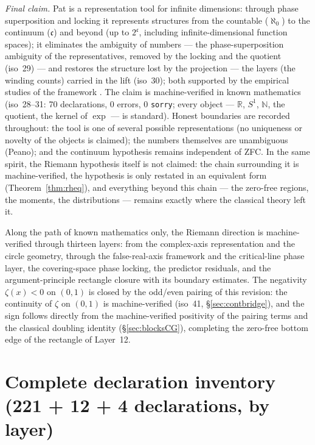 \documentclass{article}
\newcommand{\zt}{\zeta}
\begin{document}
\emph{Final claim.} Pat is a representation tool for infinite
dimensions: through phase superposition and locking it represents
structures from the countable ($\aleph_0$) to the continuum
($\mathfrak c$) and beyond (up to $2^{\mathfrak c}$, including
infinite-dimensional function spaces); it eliminates the ambiguity of
numbers --- the phase-superposition ambiguity of the representatives,
removed by the locking and the quotient (iso~29) --- and restores the
structure lost by the projection --- the layers (the winding counts)
carried in the lift (iso~30); both supported by the empirical studies
of the framework \cite{patbase}. The claim is machine-verified
in known mathematics (iso~28--31: 70 declarations, 0 errors, 0
\texttt{sorry}; every object --- $\mathbb R$, $S^1$, $\mathbb N$, the
quotient, the kernel of $\exp$ --- is standard). Honest boundaries are
recorded throughout: the tool is one of several possible
representations (no uniqueness or novelty of the objects is claimed);
the numbers themselves are unambiguous (Peano); and the continuum
hypothesis remains independent of ZFC. In the same spirit, the Riemann
hypothesis itself is not claimed: the chain surrounding it is
machine-verified, the hypothesis is only restated in an equivalent
form (Theorem~\ref{thm:rheq}), and everything beyond this chain ---
the zero-free regions, the moments, the distributions --- remains
exactly where the classical theory left it.

Along the path of known mathematics only, the Riemann direction is
machine-verified through thirteen layers: from the complex-axis representation
and the circle geometry, through the false-real-axis framework and the
critical-line phase layer, the covering-space phase locking, the predictor
residuals, and the argument-principle rectangle closure with its boundary
estimates. The negativity $\zt(x)<0$ on $(0,1)$ is closed by the odd/even
pairing of this revision: the continuity of $\zt$ on $(0,1)$ is
machine-verified (iso~41, \S\ref{sec:contbridge}), and the sign follows
directly from the machine-verified positivity of the pairing terms and the
classical doubling identity (\S\ref{sec:blocksCG}), completing the
zero-free bottom edge of the rectangle of Layer~12.

\appendix
\section{Complete declaration inventory (221 + 12 + 4 declarations, by layer)}
\label{app:inventory}
\end{document}
